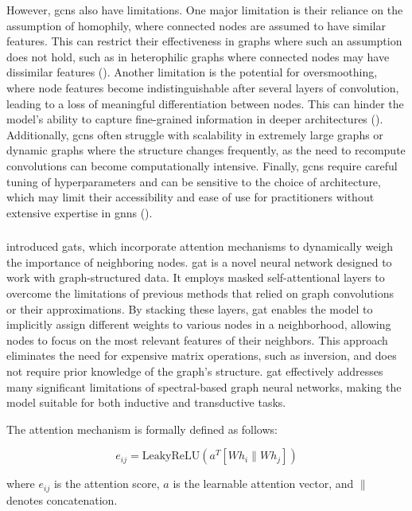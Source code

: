 However, \glspl{gcn} also have limitations.
One major limitation is their reliance on the assumption of homophily, where connected nodes are assumed to have similar features.
This can restrict their effectiveness in graphs where such an assumption does not hold, such as in heterophilic graphs where connected nodes may have dissimilar features (\cite{Xu2019}).
Another limitation is the potential for oversmoothing, where node features become indistinguishable after several layers of convolution, leading to a loss of meaningful differentiation between nodes.
This can hinder the model's ability to capture fine-grained information in deeper architectures (\cite{Li2018}).
Additionally, \glspl{gcn} often struggle with scalability in extremely large graphs or dynamic graphs where the structure changes frequently, as the need to recompute convolutions can become computationally intensive.
Finally, \glspl{gcn} require careful tuning of hyperparameters and can be sensitive to the choice of architecture, which may limit their accessibility and ease of use for practitioners without extensive expertise in \glspl{gnn} (\cite{Wu2021}).

\subsubsection*{}

\cite{Velickovic2018} introduced \glspl{gat}, which incorporate attention mechanisms to dynamically weigh the importance of neighboring nodes.
\gls{gat} is a novel neural network designed to work with graph-structured data.
It employs masked self-attentional layers to overcome the limitations of previous methods that relied on graph convolutions or their approximations.
By stacking these layers, \gls{gat} enables the model to implicitly assign different weights to various nodes in a neighborhood, allowing nodes to focus on the most relevant features of their neighbors.
This approach eliminates the need for expensive matrix operations, such as inversion, and does not require prior knowledge of the graph's structure.
\gls{gat} effectively addresses many significant limitations of spectral-based graph neural networks, making the model suitable for both inductive and transductive tasks.

The attention mechanism is formally defined as follows:

\[ e_{ij} = \text{LeakyReLU}\left(a^T [W h_i \| W h_j]\right) \]

where \( e_{ij} \) is the attention score, \( a \) is the learnable attention vector, and \( \| \) denotes concatenation.

